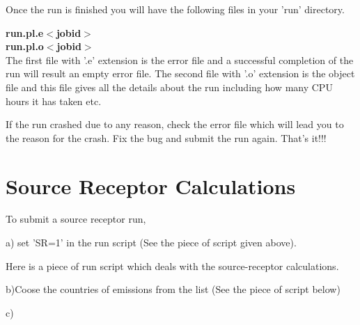 Once the run is finished you will have the following files in your
'run' directory. 

\textbf{run.pl.e$<$jobid$>$}\\
\textbf{run.pl.o$<$jobid$>$}\\

The first file with '.e' extension is the error file and a successful
completion of the run will result an empty error file.  The second
file with '.o' extension is the object file and this file gives all the
details about the run including how many CPU hours it has taken etc.  

If the run crashed due to any reason, check the error file which will
lead you to the reason for the crash.  Fix the bug and submit the run
again.  That's it!!!  


\section{Source Receptor Calculations}

To submit a source receptor run, 

a) set 'SR=1' in the run script (See the piece of script given above).  

Here is a piece of run script which deals with the source-receptor
calculations.

 b)Coose the countries of emissions from the list (See the piece of
 script below)

c) 


